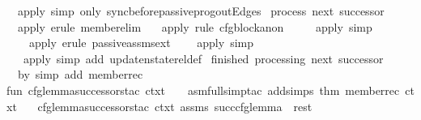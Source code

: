 \begin{isabellebody}
\ \ apply\ {\isacharparenleft}{\kern0pt}simp\ only{\isacharcolon}{\kern0pt}\ sync{\isacharunderscore}{\kern0pt}before{\isacharunderscore}{\kern0pt}passive{\isacharunderscore}{\kern0pt}prog{\isachardot}{\kern0pt}outEdges{\isacharunderscore}{\kern0pt}{}{\isacharparenright}{\kern0pt}\isanewline
{\isacharparenleft}{\kern0pt}{\isacharasterisk}{\kern0pt}\ process\ next\ successor\ {\isacharasterisk}{\kern0pt}{\isacharparenright}{\kern0pt}\isanewline
\ \ apply\ {\isacharparenleft}{\kern0pt}erule\ member{\isacharunderscore}{\kern0pt}elim{\isacharparenright}{\kern0pt}\isanewline
\ \ \ apply\ {\isacharparenleft}{\kern0pt}rule\ cfg{\isacharunderscore}{\kern0pt}block{\isacharunderscore}{\kern0pt}anon{}{\isacharparenright}{\kern0pt}\isanewline
\ \ \ \ \ apply\ simp\isanewline
\ \ \ \ apply\ {\isacharparenleft}{\kern0pt}erule\ passive{\isacharunderscore}{\kern0pt}assms{\isacharunderscore}{\kern0pt}{}{\isacharunderscore}{\kern0pt}ext{\isacharparenright}{\kern0pt}\isanewline
\ \ \ \ apply\ simp\isanewline
\ \ \ apply\ {\isacharparenleft}{\kern0pt}simp\ add{\isacharcolon}{\kern0pt}\ update{\isacharunderscore}{\kern0pt}nstate{\isacharunderscore}{\kern0pt}rel{\isacharunderscore}{\kern0pt}def{\isacharparenright}{\kern0pt}\isanewline
{\isacharparenleft}{\kern0pt}{\isacharasterisk}{\kern0pt}\ finished\ processing\ next\ successor\ {\isacharasterisk}{\kern0pt}{\isacharparenright}{\kern0pt}\isanewline
\ \ by\ {\isacharparenleft}{\kern0pt}simp\ add{\isacharcolon}{\kern0pt}\ member{\isacharunderscore}{\kern0pt}rec{\isacharparenleft}{\kern0pt}{}{\isacharparenright}{\kern0pt}{\isacharparenright}{\kern0pt}\isanewline
{\isacharasterisk}{\kern0pt}{\isacharparenright}{\kern0pt}\isanewline
\isanewline
fun\ cfg{\isacharunderscore}{\kern0pt}lemma{\isacharunderscore}{\kern0pt}successors{\isacharunderscore}{\kern0pt}tac\ ctxt\ {\isacharunderscore}{\kern0pt}\ {\isacharbrackleft}{\kern0pt}{\isacharbrackright}{\kern0pt}\ {\isacharequal}{\kern0pt}\ asm{\isacharunderscore}{\kern0pt}full{\isacharunderscore}{\kern0pt}simp{\isacharunderscore}{\kern0pt}tac\ {\isacharparenleft}{\kern0pt}add{\isacharunderscore}{\kern0pt}simps\ {\isacharbrackleft}{\kern0pt}{\isacharat}{\kern0pt}{\isacharbraceleft}{\kern0pt}thm\ member{\isacharunderscore}{\kern0pt}rec{\isacharparenleft}{\kern0pt}{}{\isacharparenright}{\kern0pt}{\isacharbraceright}{\kern0pt}{\isacharbrackright}{\kern0pt}\ ctxt{\isacharparenright}{\kern0pt}\isanewline
\ {\isacharbar}{\kern0pt}\ \ cfg{\isacharunderscore}{\kern0pt}lemma{\isacharunderscore}{\kern0pt}successors{\isacharunderscore}{\kern0pt}tac\ ctxt\ assms\ {\isacharparenleft}{\kern0pt}succ{\isacharunderscore}{\kern0pt}cfg{\isacharunderscore}{\kern0pt}lemma\ {\isacharcolon}{\kern0pt}{\isacharcolon}{\kern0pt}\ rest{\isacharparenright}{\kern0pt}\ {\isacharequal}{\kern0pt}\isanewline

\end{isabellebody}
